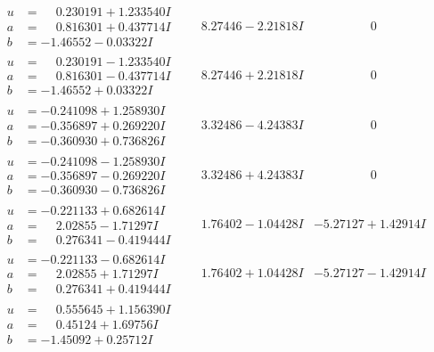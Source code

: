 \documentclass[1p]{elsarticle_modified}
\theoremstyle{definition}
\begin{document}
$$\begin{array}{c|c|c}
\begin{aligned}
u &= \phantom{-}0.230191 + 1.233540 I \\
a &= \phantom{-}0.816301 + 0.437714 I \\
b &= -1.46552 - 0.03322 I\end{aligned}
 & \phantom{-}8.27446 - 2.21818 I & \phantom{-0.000000 } 0 \\ \hline\begin{aligned}
u &= \phantom{-}0.230191 - 1.233540 I \\
a &= \phantom{-}0.816301 - 0.437714 I \\
b &= -1.46552 + 0.03322 I\end{aligned}
 & \phantom{-}8.27446 + 2.21818 I & \phantom{-0.000000 } 0 \\ \hline\begin{aligned}
u &= -0.241098 + 1.258930 I \\
a &= -0.356897 + 0.269220 I \\
b &= -0.360930 + 0.736826 I\end{aligned}
 & \phantom{-}3.32486 - 4.24383 I & \phantom{-0.000000 } 0 \\ \hline\begin{aligned}
u &= -0.241098 - 1.258930 I \\
a &= -0.356897 - 0.269220 I \\
b &= -0.360930 - 0.736826 I\end{aligned}
 & \phantom{-}3.32486 + 4.24383 I & \phantom{-0.000000 } 0 \\ \hline\begin{aligned}
u &= -0.221133 + 0.682614 I \\
a &= \phantom{-}2.02855 - 1.71297 I \\
b &= \phantom{-}0.276341 - 0.419444 I\end{aligned}
 & \phantom{-}1.76402 - 1.04428 I & -5.27127 + 1.42914 I \\ \hline\begin{aligned}
u &= -0.221133 - 0.682614 I \\
a &= \phantom{-}2.02855 + 1.71297 I \\
b &= \phantom{-}0.276341 + 0.419444 I\end{aligned}
 & \phantom{-}1.76402 + 1.04428 I & -5.27127 - 1.42914 I \\ \hline\begin{aligned}
u &= \phantom{-}0.555645 + 1.156390 I \\
a &= \phantom{-}0.45124 + 1.69756 I \\
b &= -1.45092 + 0.25712 I\end{aligned}

\end{array}$$
\end{document}

